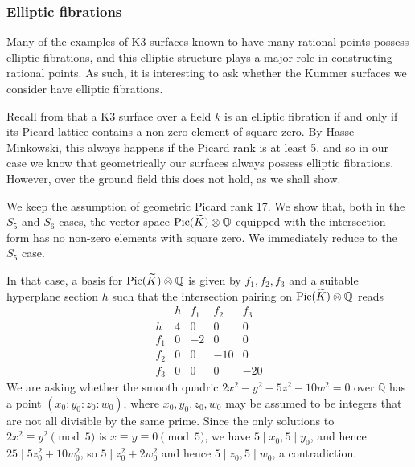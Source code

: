 \documentclass[a4paper,12pt]{amsart}
\begin{document}
\subsubsection{Elliptic fibrations}
Many of the examples of K3 surfaces known to have many rational points possess elliptic fibrations, and this elliptic structure plays a major role in constructing rational points. As such, it is interesting to ask whether the Kummer surfaces we consider have elliptic fibrations. 

Recall from \cite{pyatetskii1971torelli} that a K3 surface over a field $k$ is an elliptic fibration if and only if its Picard lattice contains a non-zero element of square zero. By Hasse-Minkowski, this always happens if the Picard rank is at least 5, and so in our case we know that geometrically our surfaces always possess elliptic fibrations. However, over the ground field this does not hold, as we shall show. 

We keep the assumption of geometric Picard rank 17. We show that, both in the $S_5$ and $S_6$ cases, the vector space ${\textnormal{Pic}}({\widetilde{{K}}}) \otimes {\mathbb{Q}}$ equipped with the intersection form has no non-zero elements with square zero. We immediately reduce to the $S_5$ case.

In that case, a basis for ${\textnormal{Pic}}({\widetilde{{K}}}) \otimes {\mathbb{Q}}$ is given by $f_1,f_2,f_3$ and a suitable hyperplane section $h$ such that the intersection pairing on  ${\textnormal{Pic}}({\widetilde{{K}}}) \otimes {\mathbb{Q}}$ reads
\begin{equation}
\begin{array}{l|llll}
 	& h & f_1 & f_2 & f_3 \\
\hline
h 	& 4 & 0   & 0   & 0   \\
f_1 	& 0 & -2  & 0   & 0   \\
f_2     & 0 & 0   & -10 & 0   \\
f_3     & 0 & 0   & 0   & -20 
\end{array}
\end{equation}
We are asking whether the smooth quadric $2x^2-y^2-5z^2-10w^2=0$ over ${\mathbb{Q}}$ has a point $(x_0 : y_0 : z_0 : w_0)$, where $x_0,y_0,z_0,w_0$ may be assumed to be integers that are not all divisible by the same prime. Since the only solutions to $2x^2 \equiv y^2 \pmod{5}$ is $x \equiv y \equiv 0 \pmod{5}$, we have $5 \mid x_0, 5 \mid y_0$, and hence $25 \mid 5z_0^2+10w_0^2$, so $5 \mid z_0^2+2w_0^2$ and hence $5 \mid z_0, 5 \mid w_0$, a contradiction.
\end{document}
